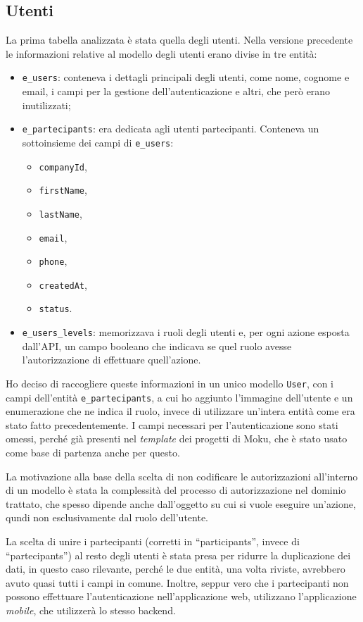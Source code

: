 \subsection{Utenti}
La prima tabella analizzata è stata quella degli utenti. Nella versione precedente le informazioni relative al modello degli utenti erano divise in tre entità:
\begin{itemize}
	\item \verb|e_users|: conteneva i dettagli principali degli utenti, come nome, cognome e email, i campi per la gestione dell'autenticazione e altri, che però erano inutilizzati;
	\item \verb|e_partecipants|: era dedicata agli utenti partecipanti. Conteneva un sottoinsieme dei campi di \verb|e_users|:
	\begin{itemize}
		\item \verb|companyId|,
		\item \verb|firstName|,
		\item \verb|lastName|,
		\item \verb|email|,
		\item \verb|phone|,
		\item \verb|createdAt|,
		\item \verb|status|.
	\end{itemize}
	\item \verb|e_users_levels|: memorizzava i ruoli degli utenti e, per ogni azione esposta dall'API, un campo booleano che indicava se quel ruolo avesse l'autorizzazione di effettuare quell'azione.
\end{itemize}
Ho deciso di raccogliere queste informazioni in un unico modello \verb|User|, con i campi dell'entità \verb|e_partecipants|, a cui ho aggiunto l'immagine dell'utente e un enumerazione che ne indica il ruolo, invece di utilizzare un'intera entità come era stato fatto precedentemente. I campi necessari per l'autenticazione sono stati omessi, perché già presenti nel \emph{template} dei progetti di Moku, che è stato usato come base di partenza anche per questo.

La motivazione alla base della scelta di non codificare le autorizzazioni all'interno di un modello è stata la complessità del processo di autorizzazione nel dominio trattato, che spesso dipende anche dall'oggetto su cui si vuole eseguire un'azione, qundi non esclusivamente dal ruolo dell'utente.

La scelta di unire i partecipanti (corretti in ``participants'', invece di ``partecipants'') al resto degli utenti è stata presa per ridurre la duplicazione dei dati, in questo caso rilevante, perché le due entità, una volta riviste, avrebbero avuto quasi tutti i campi in comune. Inoltre, seppur vero che i partecipanti non possono effettuare l'autenticazione nell'applicazione web, utilizzano l'applicazione \emph{mobile}, che utilizzerà lo stesso backend.


